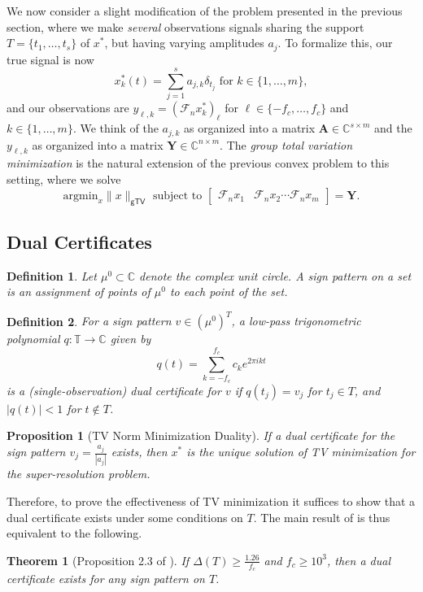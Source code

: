 \documentclass[11pt]{article}
\newcommand{\TT}{\mathbb{T}}
\newcommand{\CC}{\mathbb{C}}
\newcommand{\sF}{\mathcal{F}}
\newcommand{\argmin}{\mathrm{argmin}}
\newcommand{\bA}{\bm A}
\newcommand{\bY}{\bm Y}
\newtheorem{theorem}{Theorem}
\newtheorem{definition}{Definition}
\newtheorem{proposition}{Proposition}
\begin{document}
We now consider a slight modification of the problem presented in the previous section, where we make \emph{several} observations signals sharing the support $T = \{t_1, \dots, t_s\}$ of $x^*$, but having varying amplitudes $a_j$.
To formalize this, our true signal is now
\begin{equation}
    x^*_k(t) = \sum_{j = 1}^s a_{j, k} \delta_{t_j} \text{ for } k \in \{1, \dots, m\},
\end{equation}
and our observations are $y_{\ell, k} = (\sF_n x^*_k)_{\ell}$ for $\ell \in \{-f_c, \dots, f_c\}$ and $k \in \{1, \dots, m\}$.
We think of the $a_{j, k}$ as organized into a matrix $\bA \in \CC^{s \times m}$ and the  $y_{\ell, k}$ as organized into a matrix $\bY \in \CC^{n \times m}$.
The \emph{group total variation minimization} is the natural extension of the previous convex problem to this setting, where we solve
\begin{equation}
    \argmin_x \|x\|_{\mathsf{gTV}} \text{ subject to } \left[\begin{array}{cccc}\sF_nx_1 & \sF_n x_2 \cdots \sF_n x_m \end{array}\right] = \bY.
\end{equation}

\subsection{Dual Certificates}

\begin{definition}
    Let $\mu^0 \subset \CC$ denote the complex unit circle.
    A \emph{sign pattern} on a set is an assignment of points of $\mu^0$ to each point of the set.
\end{definition}

\begin{definition}
    For a sign pattern $v \in (\mu^0)^T$, a low-pass trigonometric polynomial $q: \TT \to \CC$ given by
    \begin{equation}
        q(t) = \sum_{k = -f_c}^{f_c} c_k e^{2\pi i k t}
    \end{equation}
    is a \emph{(single-observation) dual certificate} for $v$ if $q(t_j) = v_j$ for $t_j \in T$, and $|q(t)| < 1$ for $t \notin T$.
\end{definition}
\begin{proposition}[TV Norm Minimization Duality]
If a dual certificate for the sign pattern $v_j = \frac{a_j}{|a_j|}$ exists, then $x^*$ is the unique solution of TV minimization for the super-resolution problem.
\end{proposition}
Therefore, to prove the effectiveness of TV minimization it suffices to show that a dual certificate exists under some conditions on $T$.
The main result of \cite{fernandez2016super} is thus equivalent to the following.
\begin{theorem}[Proposition 2.3 of \cite{fernandez2016super}]
    If $\Delta(T) \geq \frac{1.26}{f_c}$ and $f_c \geq 10^3$, then a dual certificate exists for any sign pattern on $T$.
    \label{thm:single-obs-recovery}
\end{theorem}
\end{document}
